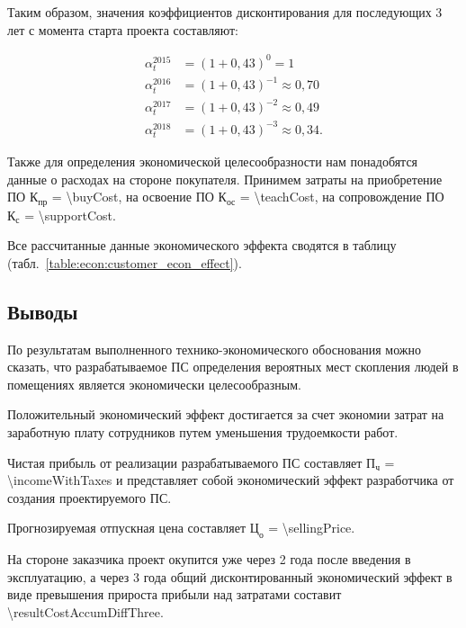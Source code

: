 Таким образом, значения коэффициентов дисконтирования для последующих 3 лет с момента старта проекта составляют:

\begin{equation}
  \label{eq:econ:discount_factor}
  \begin{aligned}
    \alpha^{2015}_t &= (1 + 0,43)^{0} = 1 \\
    \alpha^{2016}_t &= (1 + 0,43)^{-1} \approx 0,70 \\
    \alpha^{2017}_t &= (1 + 0,43)^{-2} \approx 0,49 \\
    \alpha^{2018}_t &= (1 + 0,43)^{-3} \approx 0,34 \text{.}
  \end{aligned}
\end{equation}

Также для определения экономической целесообразности нам понадобятся данные о расходах на стороне покупателя.
Принимем затраты на приобретение ПО $ \text{К}_\text{пр} $ = \SI{\buyCost}{\byr},
на освоение ПО $ \text{К}_\text{ос} $ = \SI{\teachCost}{\byr},
на сопровождение ПО $ \text{К}_\text{с} $ = \SI{\supportCost}{\byr}.

Все рассчитанные данные экономического эффекта сводятся в таблицу (табл.~\ref{table:econ:customer_econ_effect}).

\subsection{Выводы}

По результатам выполненного технико-экономического обоснования можно сказать,
что разрабатываемое ПС определения вероятных мест скопления людей в помещениях является экономически целесообразным.

Положительный экономический эффект достигается за счет экономии затрат на заработную плату сотрудников путем уменьшения трудоемкости работ.

Чистая прибыль от реализации разрабатываемого ПС составляет $ \text{П}_\text{ч} $ = \SI{\incomeWithTaxes}{\byr{}}
и представляет собой экономический эффект разработчика от создания проектируемого ПС.

Прогнозируемая отпускная цена составляет $ \text{Ц}_\text{о} $ = \SI{\sellingPrice}{\byr{}}.

На стороне заказчика проект окупится уже через 2 года после введения в эксплуатацию,
а через 3 года общий дисконтированный экономический эффект в виде превышения прироста прибыли над затратами составит \SI{\resultCostAccumDiffThree}{\byr}.
